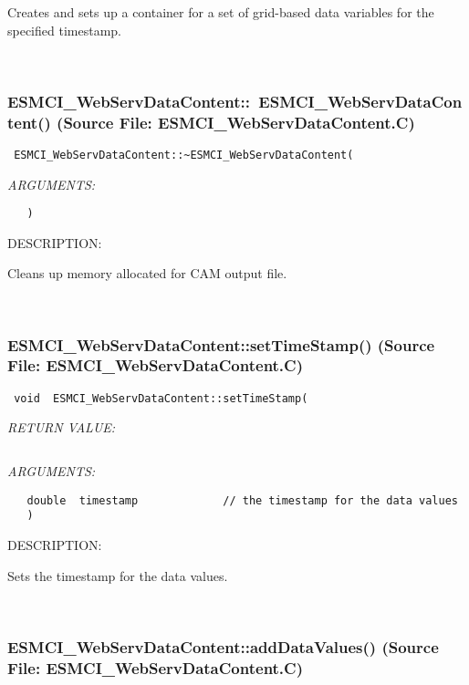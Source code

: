       Creates and sets up a container for a set of grid-based data variables
      for the specified timestamp.
   
 
\mbox{}\hrulefill\
 
\subsubsection{ESMCI\_WebServDataContent::~ESMCI\_WebServDataContent() (Source File: ESMCI\_WebServDataContent.C)}


  
\begin{verbatim} ESMCI_WebServDataContent::~ESMCI_WebServDataContent(\end{verbatim}{\em ARGUMENTS:}
\begin{verbatim}   )\end{verbatim}
{\sf DESCRIPTION:\\ }


      Cleans up memory allocated for CAM output file.
   
 
\mbox{}\hrulefill\
 
\subsubsection{ESMCI\_WebServDataContent::setTimeStamp() (Source File: ESMCI\_WebServDataContent.C)}


  
\begin{verbatim} void  ESMCI_WebServDataContent::setTimeStamp(\end{verbatim}{\em RETURN VALUE:}
\begin{verbatim} \end{verbatim}{\em ARGUMENTS:}
\begin{verbatim}   double  timestamp             // the timestamp for the data values
   )\end{verbatim}
{\sf DESCRIPTION:\\ }


      Sets the timestamp for the data values.
   
 
\mbox{}\hrulefill\
 
\subsubsection{ESMCI\_WebServDataContent::addDataValues() (Source File: ESMCI\_WebServDataContent.C)}


